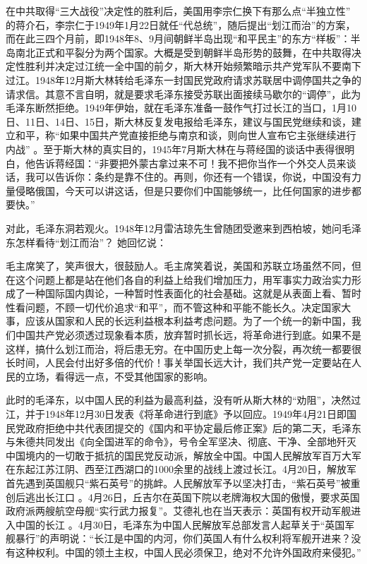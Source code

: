 \documentclass[UTF8, 12pt, a4paper]{ctexrep}
\begin{document}
在中共取得“三大战役”决定性的胜利后，美国用李宗仁换下有那么点“半独立性” 的蒋介石，李宗仁于1949年1月22日就任“代总统”，随后提出“划江而治”的方案，而在此三四个月前，即1948年8、9月间朝鲜半岛出现“和平民主”的东方“样板”：半岛南北正式和平裂分为两个国家。大概是受到朝鲜半岛形势的鼓舞，在中共取得决定性胜利并决定过江统一全中国的前夕，斯大林开始频繁暗示共产党军队不要南下过江。1948年12月斯大林转给毛泽东一封国民党政府请求苏联居中调停国共之争的请求信。其意不言自明，就是要求毛泽东接受苏联出面接续马歇尔的“调停”，此为毛泽东断然拒绝。1949年伊始，就在毛泽东准备一鼓作气打过长江的当口，1月10日、11日、14日、15日，斯大林反复发电报给毛泽东，建议与国民党继续和谈，建立和平，称“如果中国共产党直接拒绝与南京和谈，则向世人宣布它主张继续进行内战” 。至于斯大林的真实目的，1945年7月斯大林在与蒋经国的谈话中表得很明白，他告诉蒋经国：“非要把外蒙古拿过来不可！我不把你当作一个外交人员来谈话，我可以告诉你：条约是靠不住的。再则，你还有一个错误，你说，中国没有力量侵略俄国，今天可以讲这话，但是只要你们中国能够统一，比任何国家的进步都要快。”

对此，毛泽东洞若观火。1948年12月雷洁琼先生曾随团受邀来到西柏坡，她问毛泽东怎样看待“划江而治”？ 她回忆说：

毛主席笑了，笑声很大，很鼓励人。毛主席笑着说，美国和苏联立场虽然不同，但在这个问题上都是站在他们各自的利益上给我们增加压力，用军事实力政治实力形成了一种国际国内舆论，一种暂时性表面化的社会基础。这就是从表面上看、暂时性看问题，不顾一切代价追求“和平”，而不管这种和平能不能长久。决定国家大事，应该从国家和人民的长远利益根本利益考虑问题。为了一个统一的新中国，我们中国共产党必须透过现象看本质，放弃暂时抓长远，将革命进行到底。如果不是这样，搞什么划江而治，将后患无穷。在中国历史上每一次分裂，再次统一都要很长时间，人民会付出好多倍的代价！事关举国长远大计，我们共产党一定要站在人民的立场，看得远一点，不受其他国家的影响。

此时的毛泽东，以中国人民的利益为最高利益，没有听从斯大林的“劝阻”，决然过江，并于1948年12月30日发表《将革命进行到底》予以回应。1949年4月21日即国民党政府拒绝中共代表团提交的《国内和平协定最后修正案》后的第二天，毛泽东与朱德共同发出《向全国进军的命令》，号令全军坚决、彻底、干净、全部地歼灭中国境内的一切敢于抵抗的国民党反动派，解放全中国。中国人民解放军百万大军在东起江苏江阴、西至江西湖口的1000余里的战线上渡过长江。4月20日，解放军首先遇到英国舰只“紫石英号”的挑衅。人民解放军予以坚决打击，“紫石英号”被重创后逃出长江口 。4月26日，丘吉尔在英国下院以老牌海权大国的傲慢，要求英国政府派两艘航空母舰“实行武力报复”。艾德礼也在当天表示：英国有权开动军舰进入中国的长江 。4月30日，毛泽东为中国人民解放军总部发言人起草关于“英国军舰暴行”的声明说：“长江是中国的内河，你们英国人有什么权利将军舰开进来？没有这种权利。中国的领土主权，中国人民必须保卫，绝对不允许外国政府来侵犯。”
\end{document}
